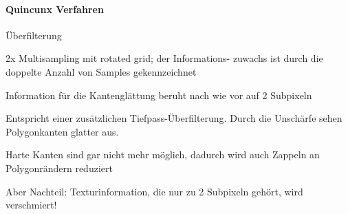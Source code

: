 \documentclass[landscape]{article}
\begin{document}
\begin{multicols}{3}
  \paragraph{Quincunx Verfahren}
  \begin{itemize*}
    \item Überfilterung
    \item 2x Multisampling mit rotated grid; der Informations- zuwachs ist durch die doppelte Anzahl von Samples gekennzeichnet
    \item Information für die Kantenglättung beruht nach wie vor auf 2 Subpixeln
    \item Entspricht einer zusätzlichen Tiefpass-Überfilterung. Durch die Unschärfe sehen Polygonkanten glatter aus.
    \item Harte Kanten sind gar nicht mehr möglich, dadurch wird auch Zappeln an Polygonrändern reduziert
    \item Aber Nachteil: Texturinformation, die nur zu 2 Subpixeln gehört, wird verschmiert!
  \end{itemize*}
  

\end{multicols}
\end{document}
